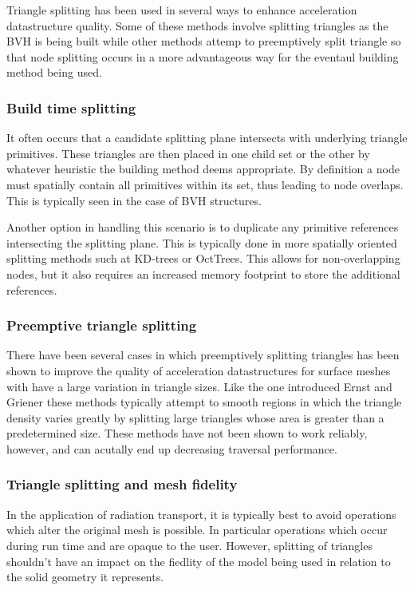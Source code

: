 \documentclass[12pt, a4paper]{article}
\begin{document}
Triangle splitting has been used in several ways to enhance acceleration datastructure quality. Some of these methods involve splitting triangles as the BVH is being built while other methods attemp to preemptively split triangle so that node splitting occurs in a more advantageous way for the eventaul building method being used.

\subsubsection{Build time splitting}%

It often occurs that a candidate splitting plane intersects with underlying triangle primitives. These triangles are then placed in one child set or the other by whatever heuristic the building method deems appropriate. By definition a node must spatially contain all primitives within its set, thus leading to node overlaps. This is typically seen in the case of BVH structures.

Another option in handling this scenario is to duplicate any primitive references intersecting the splitting plane. This is typically done in more spatially oriented splitting methods such at KD-trees or OctTrees. This allows for non-overlapping nodes, but it also requires an increased memory footprint to store the additional references.

\subsubsection{Preemptive triangle splitting}%

There have been several cases in which preemptively splitting triangles has been shown to improve the quality of acceleration datastructures for surface meshes with have a large variation in triangle sizes. Like the one introduced Ernst and Griener \cite{ernst_2007} these methods typically attempt to smooth regions in which the triangle density varies greatly by splitting large triangles whose area is greater than a predetermined size. These methods have not been shown to work reliably, however, and can acutally end up decreasing traversal performance.

\subsubsection{Triangle splitting and mesh fidelity}%

In the application of radiation transport, it is typically best to avoid operations which alter the original mesh is possible. In particular operations which occur during run time and are opaque to the user. However, splitting of triangles shouldn't have an impact on the fiedlity of the model being used in relation to the solid geometry it represents.
\end{document}
